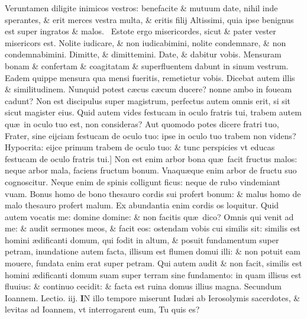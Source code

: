 \documentclass[a5paper,10pt]{book}
\def\leftmarginnote{%
	\lrmarginnote{\hskip -\marginparsep \hskip -6.5em}}
\def\rightmarginnote{%
	\lrmarginnote{\hskip\columnwidth \hskip -1em}}
\def\ae{æ}
\begin{document}
\begin{multicols*}{2}
Veruntamen diligite inimicos vestros: benefacite \& mutuum date, nihil inde sperantes, \& erit merces vestra multa, \& eritis filij Altissimi, quia ipse benignus est super ingratos \& malos.
\textdagger \ Estote\leftmarginnote{\begin{flushright}D\end{flushright}} ergo misericordes, sicut \& pater vester misericors est.
Nolite iudicare, \& non iudicabimini, nolite condemnare, \& non condemnabimini. Dimitte, \& dimittemini.
Date, \& dabitur vobis. Mensuram bonam \& confertam \& coagitatam \& superfluentem dabunt in sinum vestrum.
Eadem quippe mensura qua mensi fueritis, remetietur vobis.
Dicebat autem illis \& similitudinem. Nunquid potest c\ae cus c\ae cum ducere? nonne ambo in foueam cadunt?
Non est discipulus super magistrum, perfectus autem omnis erit, si sit sicut magister eius.
Quid autem vides festucam in oculo fratris tui, trabem autem qu\ae \ in oculo tuo est, non consideras?
Aut quomodo potes dicere fratri tuo, Frater, sine eijciam festucam de oculo tuo: ipse in oculo tuo trabem non videns?
Hypocrita: eijce primum trabem de oculo tuo: \& tunc perspicies vt educas festucam de oculo fratris tui.]
Non\leftmarginnote{\begin{flushright}E\end{flushright}} est enim arbor bona qu\ae \ facit fructus malos: neque arbor mala, faciens fructum bonum.
Vnaqu\ae que enim arbor de fructu suo cognoscitur.
Neque enim de spinis colligunt ficus: neque de rubo vindemiant vuam.
Bonus homo de bono thesauro cordis sui profert bonum: \& malus homo de malo thesauro profert malum.
Ex abundantia enim cordis os loquitur.
Quid autem vocatis me: 
domine domine: \& non facitis qu\ae \ dico?
Omnis qui venit ad me: \& audit sermones meos, \& facit eos: ostendam vobis cui similis sit: similis est homini \ae dificanti domum, qui fodit in altum, \& posuit fundamentum super petram, inundatione autem facta, illisum est flumen domui illi: \& non potuit eam mouere, fundata enim erat super petram.
Qui autem audit \& non facit, similis est homini \ae dificanti domum suam super terram sine fundamento: in quam illisus est fluuius: \& continuo cecidit: \& facta est ruina domus illius magna.
\newline \color{red} Secundum Ioannem. \hfill Lectio. iij. \color{black}
\vspace{-.25em}
\lettrine[lines=2]{\bfseries \color{red} I}{}N\rightmarginnote{ca. 1.} illo tempore miserunt Iud\ae i ab Ierosolymis sacerdotes, \& levitas ad Ioannem, vt interrogarent eum, Tu quis es?

\end{multicols*}
\end{document}
